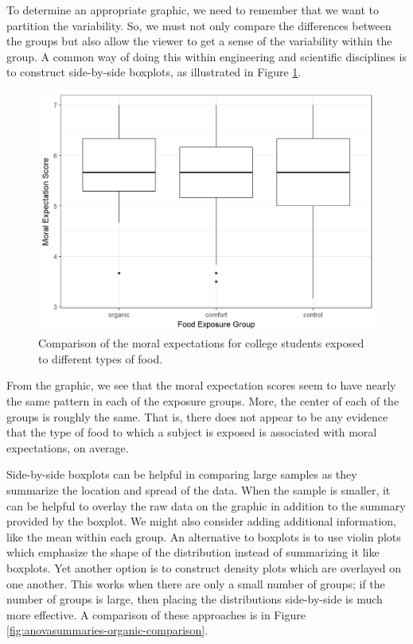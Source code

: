 \documentclass[]{book}
\theoremstyle{plain}
\theoremstyle{mydefn}
\theoremstyle{myexmpl}
\theoremstyle{remark}
\begin{document}
To determine an appropriate graphic, we need to remember that we want to
partition the variability. So, we must not only compare the differences
between the groups but also allow the viewer to get a sense of the
variability within the group. A common way of doing this within
engineering and scientific disciplines is to construct side-by-side
boxplots, as illustrated in Figure
\ref{fig:anovasummaries-organic-boxplot}.

\begin{figure}

{\centering \includegraphics[width=0.8\linewidth]{./Images/anovasummaries-organic-boxplot-1} 

}

\caption{Comparison of the moral expectations for college students exposed to different types of food.}\label{fig:anovasummaries-organic-boxplot}
\end{figure}

From the graphic, we see that the moral expectation scores seem to have
nearly the same pattern in each of the exposure groups. More, the center
of each of the groups is roughly the same. That is, there does not
appear to be any evidence that the type of food to which a subject is
exposed is associated with moral expectations, on average.

Side-by-side boxplots can be helpful in comparing large samples as they
summarize the location and spread of the data. When the sample is
smaller, it can be helpful to overlay the raw data on the graphic in
addition to the summary provided by the boxplot. We might also consider
adding additional information, like the mean within each group. An
alternative to boxplots is to use violin plots which emphasize the shape
of the distribution instead of summarizing it like boxplots. Yet another
option is to construct density plots which are overlayed on one another.
This works when there are only a small number of groups; if the number
of groups is large, then placing the distributions side-by-side is much
more effective. A comparison of these approaches is in Figure
\ref{fig:anovasummaries-organic-comparison}.
\end{document}
